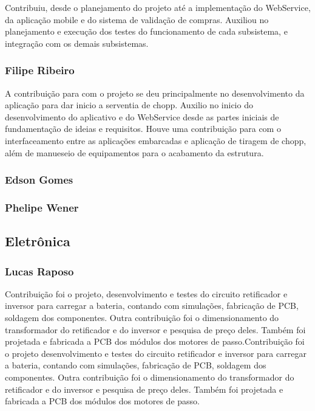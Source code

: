 \begin{apendicesenv}
Contribuiu, desde o planejamento do projeto até a implementação do WebService, da aplicação mobile
e do sistema de validação de compras. Auxiliou no planejamento e execução dos testes do funcionamento
de cada subsistema, e integração com os demais subsistemas.

\subsubsection{Filipe Ribeiro}

A contribuição para com o projeto se deu principalmente no desenvolvimento da aplicação para dar inicio
a serventia de chopp. Auxilio no inicio do desenvolvimento do aplicativo e do WebService desde as partes
iniciais de fundamentação de ideias e requisitos. Houve uma contribuição para com o interfaceamento entre 
as aplicações embarcadas e aplicação de tiragem de chopp, além de manueseio de equipamentos para o acabamento
da estrutura.

\subsubsection{Edson Gomes}

\subsubsection{Phelipe Wener}

\subsection{Eletrônica}

\subsubsection{Lucas Raposo}

Contribuição foi o projeto, desenvolvimento e testes do circuito retificador
e inversor para carregar a bateria, contando com simulações, fabricação de PCB,
soldagem dos componentes. Outra contribuição foi o dimensionamento do transformador 
do retificador e do inversor e pesquisa de preço deles. Também foi projetada e fabricada
a PCB dos módulos dos motores de passo.Contribuição foi o projeto desenvolvimento
e testes do circuito retificador e inversor para carregar a bateria, contando com simulações, 
fabricação de PCB, soldagem dos componentes. Outra contribuição foi o dimensionamento
do transformador do retificador e do inversor e pesquisa de preço deles. Também foi projetada
e fabricada a PCB dos módulos dos motores de passo.


\end{apendicesenv}
